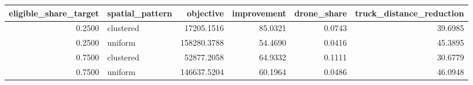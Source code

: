 \begin{tabular}{rlrrrr}
\toprule
eligible_share_target & spatial_pattern & objective & improvement & drone_share & truck_distance_reduction \\
\midrule
0.2500 & clustered & 17205.1516 & 85.0321 & 0.0743 & 39.6985 \\
0.2500 & uniform & 158280.3788 & 54.4690 & 0.0416 & 45.3895 \\
0.7500 & clustered & 52877.2058 & 64.9332 & 0.1111 & 30.6779 \\
0.7500 & uniform & 146637.5204 & 60.1964 & 0.0486 & 46.0948 \\
\bottomrule
\end{tabular}
